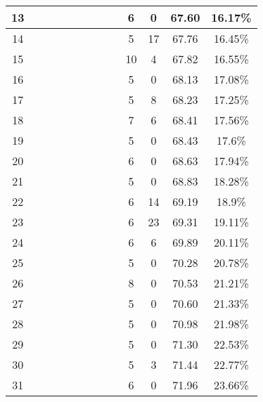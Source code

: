 \begin{longtable}{|c|c|c|c|c|c|c|c|c|c|c|c|c|}
13 &  \x    & \x    & \x    &       & \x\m  & \x    &       &       & 6 & 0 & 67.60 & 16.17\% \\ \hline
14 &  \x    & \x    & \x    & \x    & \x\m  &       & \x\m  &       & 5 & 17 & 67.76 & 16.45\% \\ \hline
15 &  \x    & \x    & \x    &       & \x\m  & \x\m  & \x\m  &       & 10 & 4 & 67.82 & 16.55\% \\ \hline
16 &  \x    & \x    & \x    &       & \x\m  & \x    & \x    &       & 5 & 0 & 68.13 & 17.08\% \\ \hline
17 &  \x    & \x    & \x    & \x    & \x\m  & \x    &       & \x\m  & 5 & 8 & 68.23 & 17.25\% \\ \hline
18 &  \x    & \x    & \x    & \x    & \x\m  &       &       & \x    & 7 & 6 & 68.41 & 17.56\% \\ \hline
19 &  \x    & \x    & \x    &       & \x    & \x    & \x    &       & 5 & 0 & 68.43 & 17.6\% \\ \hline
20 &  \x    & \x    &       & \x    & \x\m  & \x\m  &       & \x\m  & 6 & 0 & 68.63 & 17.94\% \\ \hline
21 &  \x    & \x    & \x    & \x    & \x\m  &       &       & \x\m  & 5 & 0 & 68.83 & 18.28\% \\ \hline
22 &  \x    & \x    & \x    &       & \x\m  &       & \x    &       & 6 & 14 & 69.19 & 18.9\% \\ \hline
23 &  \x    & \x    & \x    & \x    & \x\m  & \x    &       & \x    & 6 & 23 & 69.31 & 19.11\% \\ \hline
24 &  \x    & \x    & \x    &       & \x\m  &       & \x\m  &       & 6 & 6 & 69.89 & 20.11\% \\ \hline
25 &  \x    & \x    & \x    & \x    & \x    & \x    &       & \x    & 5 & 0 & 70.28 & 20.78\% \\ \hline
26 &  \x    & \x    & \x    &       & \x\m  &       & \x\m  &       & 8 & 0 & 70.53 & 21.21\% \\ \hline
27 &  \x    & \x    & \x    & \x    & \x    & \x\m  &       & \x    & 5 & 0 & 70.60 & 21.33\% \\ \hline
28 &  \x    & \x    & \x    &       & \x    & \x    &       &       & 5 & 0 & 70.98 & 21.98\% \\ \hline
29 &  \x    & \x    & \x    &       & \x\m  & \x    &       & \x    & 5 & 0 & 71.30 & 22.53\% \\ \hline
30 &  \x    & \x    & \x    &       & \x    & \x\m  &       &       & 5 & 3 & 71.44 & 22.77\% \\ \hline
31 &  \x    & \x    & \x    &       &       &       &       &       & 6 & 0 & 71.96 & 23.66\% \\ \hline

\end{longtable}
